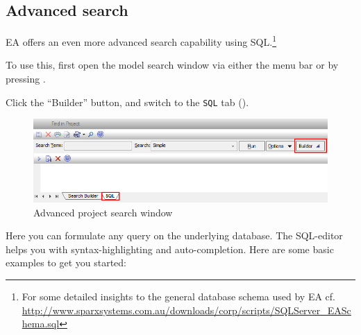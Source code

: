 \subsection{Advanced search}
\label{sect:appendix_adv_search}

EA offers an even more advanced search capability using SQL.\footnote{For some detailed insights to the general database schema used by EA cf. \\
\url{http://www.sparxsystems.com.au/downloads/corp/scripts/SQLServer_EASchema.sql}}

\begin{stepbystep}

\item To use this, first open the model search window via either the menu bar or by pressing .

\item Click the ``Builder'' button, and switch to the \texttt{SQL} tab (). 

\begin{figure}[htbp]
\begin{center}
  \includegraphics[width=\textwidth]{ea_activateSQLSearch}
  \caption{Advanced project search window}  
  \label{ea:builderSQLtab}
\end{center}
\end{figure}

\end{stepbystep}

Here you can formulate any query on the underlying database. The SQL-editor helps you with syntax-highlighting and auto-completion. Here are some basic
examples to get you started:

